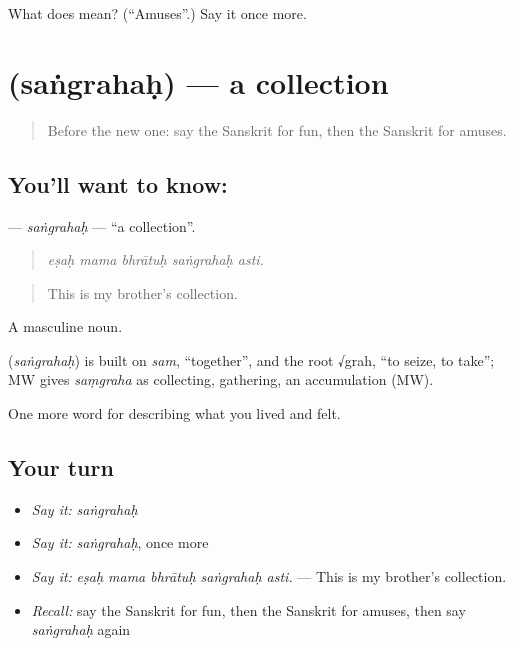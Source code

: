 \begin{tcolorbox}[breakable,colback=teal!4,colframe=teal!35!black,title={Before you move on}]
What does  mean? (\textquotedblleft{}Amuses\textquotedblright{}.) Say it once more.
\end{tcolorbox}
\section[\texorpdfstring{\sk{संग्रहः} (saṅgrahaḥ)}{संग्रहः (saṅgrahaḥ)}]{ (saṅgrahaḥ) — a collection}

\label{lesson:SA-C516-sangrahah}



\begin{quote}
Before the new one: say the Sanskrit for fun, then the Sanskrit for amuses.
\end{quote}

\subsection*{You'll want to know: }
\textbf{} — \emph{saṅgrahaḥ} — \textquotedblleft{}a collection\textquotedblright{}.

\begin{quote}
    
\end{quote}

\begin{quote}
\emph{eṣaḥ mama bhrātuḥ saṅgrahaḥ asti.}
\end{quote}

\begin{quote}
This is my brother's collection.
\end{quote}

A masculine noun.

\begin{cousinweb}
\textbf{} (\emph{saṅgrahaḥ}) is built on \emph{sam}, \textquotedblleft{}together\textquotedblright{}, and the root √grah, \textquotedblleft{}to seize, to take\textquotedblright{}; MW gives \emph{saṃgraha} as collecting, gathering, an accumulation (MW).
\end{cousinweb}

\begin{grammarlens}[title={What you've built}]
One more word for describing what you lived and felt.
\end{grammarlens}

\subsection*{Your turn}
\begin{itemize}
\raggedright
  \item \emph{Say it:} \emph{saṅgrahaḥ}
  \item \emph{Say it:} \emph{saṅgrahaḥ}, once more
  \item \emph{Say it:} \emph{eṣaḥ mama bhrātuḥ saṅgrahaḥ asti.} — This is my brother's collection.
  \item \emph{Recall:} say the Sanskrit for fun, then the Sanskrit for amuses, then say \emph{saṅgrahaḥ} again
\end{itemize}

